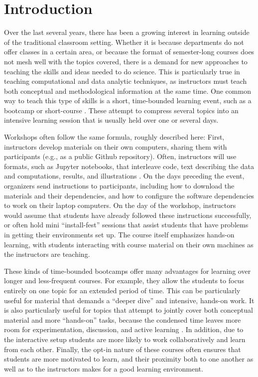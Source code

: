 \section{Introduction}

Over the last several years, there has been a growing interest in learning
outside of the traditional classroom setting. Whether it is because departments
do not offer classes in a certain area, or because the format of semester-long
courses does not mesh well with the topics covered, there is a demand for new
approaches to teaching the skills and ideas needed to do science. This is
particularly true in teaching computational and data analytic techniques,
as instructors must teach both conceptual and methodological information
at the same time. One common way to teach this type of skills is a short,
time-bounded learning event, such as a bootcamp or short-course
\cite{wilson2016software}. These attempt to compress several
topics into an intensive learning session that is usually held over one or
several days.

Workshops often follow the same formula, roughly described here: First,
instructors develop materials on their own computers, sharing them with
participants (e.g., as a public Github repository). Often, instructors will use
formats, such as Jupyter notebooks, that interleave code, text describing the
data and computations, results, and illustrations
\cite{kluyver2016jupyter}. On the days preceding the event, organizers send
instructions to participants, including how to download the materials and their
dependencies, and how to configure the software dependencies to work on their
laptop computers. On the day of the workshop, instructors would assume that
students have already followed these instructions successfully, or often hold
mini ``install-fest'' sessions that assist students that have problems in
getting their environments set up. The course itself emphasizes hands-on
learning, with students interacting with course material on their own
machines as the instructors are teaching.

These kinds of time-bounded bootcamps offer many advantages for learning over
longer and less-frequent courses. For example, they allow the students to focus
entirely on one topic for an extended period of time. This can be particularly
useful for material that demands a ``deeper dive'' and intensive, hands-on
work. It is also particularly useful for topics that attempt to jointly
cover both conceptual material and more ``hands-on'' tasks, because the
condensed time leaves more room for experimentation, discussion, and active
learning \citep{Bransford2000-lu, Papert1980-fh}. In addition, due to the
interactive setup students are more likely to work collaboratively and learn
from each other. Finally, the opt-in nature of these
courses often ensures that students are more motivated to learn, and their
proximity both to one another as well as to the instructors makes for a good
learning environment.

